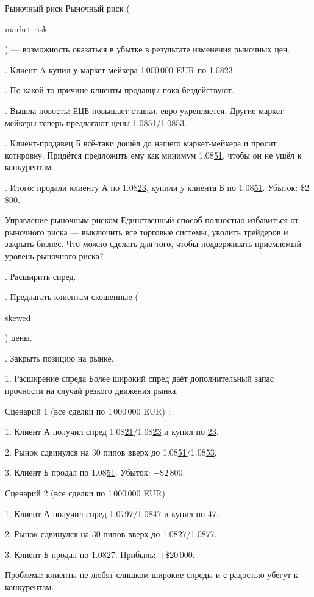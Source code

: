 \documentclass{beamer}
\newcommand{\en}[1]{\begin{otherlanguage}{english}#1\end{otherlanguage}}
\newcommand{\eurusdBigFigures}{1.08}
\newcommand{\eurusdBigFiguresMinusOne}{1.07}
\begin{document}
\begin{frame}{Рыночный риск}
\justify
\alert{Рыночный риск} (\en{market risk}) --- возможность оказаться в убытке в результате изменения рыночных цен.

. Клиент A купил у маркет-мейкера 1\,000\,000 EUR по \eurusdBigFigures\underline{23}.

. По какой-то причине клиенты-продавцы пока бездействуют.

. Вышла новость: ЕЦБ повышает ставки, евро укрепляется. Другие маркет-мейкеры теперь предлагают цены \eurusdBigFigures\underline{51}/\eurusdBigFigures\underline{53}.

. Клиент-продавец Б всё-таки дошёл до нашего маркет-мейкера и просит котировку.
Придётся предложить ему как минимум \eurusdBigFigures\underline{51}, чтобы он не ушёл к конкурентам.

. Итого: продали клиенту А по \eurusdBigFigures\underline{23}, купили у клиента Б по
\eurusdBigFigures\underline{51}. Убыток: \$2\,800.
\end{frame}



\begin{frame}{Управление рыночным риском}
\justify
Единственный способ полностью избавиться от рыночного риска --- выключить 
все торговые системы, уволить трейдеров и закрыть бизнес. Что можно сделать
для того, чтобы поддерживать приемлемый уровень рыночного риска?

. Расширить спред.

. Предлагать клиентам скошенные (\en{skewed}) цены.

. Закрыть позицию на рынке.
\end{frame}



\begin{frame}{1. Расширение спреда}
\justify
Более широкий спред даёт дополнительный запас прочности на случай резкого
движения рынка.

\justify
Сценарий 1 (все сделки по 1\,000\,000 EUR) :

1. Клиент А получил спред \eurusdBigFigures\underline{21}/\eurusdBigFigures\underline{23} и купил по \underline{23}.

2. Рынок сдвинулся на 30 пипов вверх до \eurusdBigFigures\underline{51}/\eurusdBigFigures\underline{53}.

3. Клиент Б продал по \eurusdBigFigures\underline{51}. Убыток: $-\$2\,800$.

\justify
Сценарий 2 (все сделки по 1\,000\,000 EUR) :

1. Клиент А получил спред \eurusdBigFiguresMinusOne\underline{97}/\eurusdBigFigures\underline{47} и купил по \underline{47}.

2. Рынок сдвинулся на 30 пипов вверх до \eurusdBigFigures\underline{27}/\eurusdBigFigures\underline{77}.

3. Клиент Б продал по \eurusdBigFigures\underline{27}. Прибыль: $+\$20\,000$.

\justify
Проблема: клиенты не любят слишком широкие спреды и с радостью убегут к 
конкурентам.
\end{frame}
\end{document}
